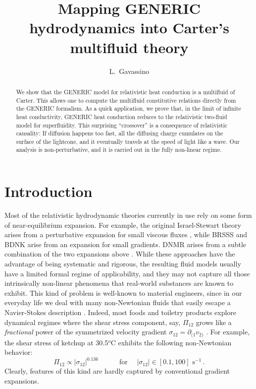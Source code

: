 \documentclass[a4paper, amsfonts, amssymb, amsmath, reprint, showkeys, nofootinbib, twoside, onecolumn, notitlepage]{revtex4-1}
\newcommand{\spc}{\quad \quad \quad}
\begin{document}
\title{Mapping GENERIC hydrodynamics into Carter's multifluid theory}
\author{L.~Gavassino}


\begin{abstract}
We show that the GENERIC model for relativistic heat conduction is a multifluid of Carter. This allows one to compute the multifluid constitutive relations directly from the GENERIC formalism. As a quick application, we prove that, in the limit of infinite heat conductivity, GENERIC heat conduction reduces to the relativistic two-fluid model for superfluidity. This surprising ``crossover'' is a consequence of relativistic causality: If diffusion happens too fast, all the diffusing charge cumulates on the surface of the lightcone, and it eventually travels at the speed of light like a wave. Our analysis is non-perturbative, and it is carried out in the fully non-linear regime.
\end{abstract} 

\maketitle

\section{Introduction}\label{intro}
Most of the relativistic hydrodynamic theories currently in use rely on some form of near-equilibrium expansion. For example, the original Israel-Stewart theory arises from a perturbative expansion for small viscous fluxes \cite{Israel_Stewart_1979,Hishcock1983,Israel_2009_inbook,Salazar2020}, while BRSSS \cite{Baier2008} and BDNK \cite{BemficaDNDefinitivo2020} arise from an expansion for small gradients. DNMR arises from a subtle combination of the two expansions above \cite{Denicol2012Boltzmann}. While these approaches have the advantage of being systematic and rigorous, the resulting fluid models usually have a limited formal regime of applicability, and they may not capture all those intrinsically non-linear phenomena that real-world substances are known to exhibit. This kind of problem is well-known to material engineers, since in our everyday life we deal with many non-Newtonian fluids that easily escape a Navier-Stokes description \cite{Tropea_book}.  Indeed, most foods and toiletry products explore dynamical regimes where the shear stress component, say, $\Pi_{12}$ grows like a \textit{fractional} power of the symmetrized velocity gradient $\sigma_{12}=\partial_{(1}v_{2)}$ \cite{Steffe_book}. For example, the shear stress of ketchup at 30.5$^o$C exhibits the following non-Newtonian behavior:
\begin{equation}
    \Pi_{12} \propto |\sigma_{12}|^{0.136} \spc \text{for } \quad |\sigma_{12}| \in [0.1,100] \text{ s}^{-1} \, .
\end{equation}
Clearly, features of this kind are hardly captured by conventional gradient expansions.
\end{document}

